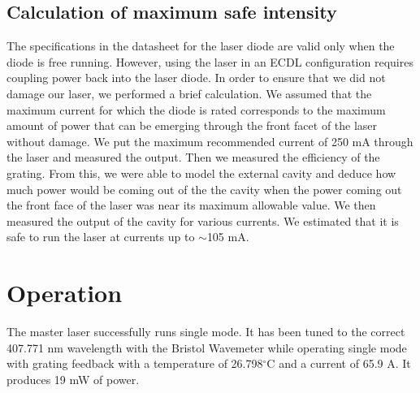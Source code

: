 \subsection{Calculation of maximum safe intensity}

The specifications in the datasheet for the laser diode are valid only when the diode is free running. However, using the laser in an ECDL configuration requires coupling power back into the laser diode. In order to ensure that we did not damage our laser, we performed a brief calculation. We assumed that the maximum current for which the diode is rated corresponds to the maximum amount of power that can be emerging through the front facet of the laser without damage. We put the maximum recommended current of 250 mA through the laser and measured the output. Then we measured the efficiency of the grating. From this, we were able to model the external cavity and deduce how much power would be coming out of the the cavity when the power coming out the front face of the laser was near its maximum allowable value. We then measured the output of the cavity for various currents. We estimated that it is safe to run the laser at currents up to $\sim$105 mA. 

 
\section{Operation}

The master laser successfully runs single mode. It has been tuned to the correct 407.771 nm wavelength with the Bristol Wavemeter while operating single mode with grating feedback with a temperature of 26.798$^\circ$C and a current of 65.9 A. It produces 19 mW of power. 




